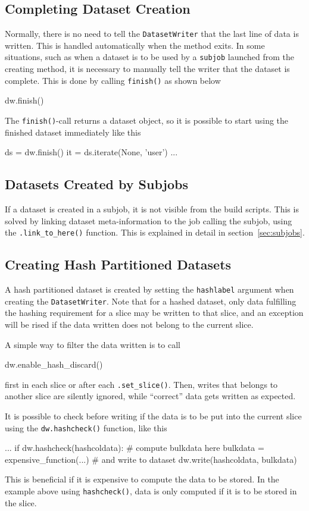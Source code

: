 \subsection{Completing Dataset Creation}
Normally, there is no need to tell the \texttt{DatasetWriter} that the
last line of data is written.  This is handled automatically when the
method exits.  In some situations, such as when a dataset is to be
used by a \texttt{subjob} launched from the creating method, it is
necessary to manually tell the writer that the dataset is complete.
This is done by calling \texttt{finish()} as shown below
\begin{python}
dw.finish()
\end{python}
The \texttt{finish()}-call returns a dataset object, so it is possible
to start using the finished dataset immediately like this
\begin{python}
ds = dw.finish()
it = ds.iterate(None, 'user')
...
\end{python}



\subsection{Datasets Created by Subjobs}
If a dataset is created in a subjob, it is not visible from the build
scripts.  This is solved by linking dataset meta-information to the
job calling the subjob, using the \texttt{.link\_to\_here()} function.
This is explained in detail in section~\ref{sec:subjobs}.


\subsection{Creating Hash Partitioned Datasets}
A hash partitioned dataset is created by setting
the \texttt{hashlabel} argument when creating
the \texttt{DatasetWriter}.  Note that for a hashed dataset, only data
fulfilling the hashing requirement for a slice may be written to that
slice, and an exception will be rised if the data written does not
belong to the current slice.

A simple way to filter the data written is to call
\begin{python}
dw.enable_hash_discard()
\end{python}
first in each slice or after each \texttt{.set\_slice()}.  Then,
writes that belongs to another slice are silently ignored, while
``correct'' data gets written as expected.

It is possible to check before writing if the data is to be put into
the current slice using the \texttt{dw.hashcheck()} function, like
this
\begin{python}
...
if dw.hashcheck(hashcoldata):
    # compute bulkdata here
    bulkdata = expensive_function(...)
    # and write to dataset
    dw.write(hashcoldata, bulkdata)
\end{python}
This is beneficial if it is expensive to compute the data to be
stored.  In the example above using \texttt{hashcheck()}, data is only
computed if it is to be stored in the slice.

